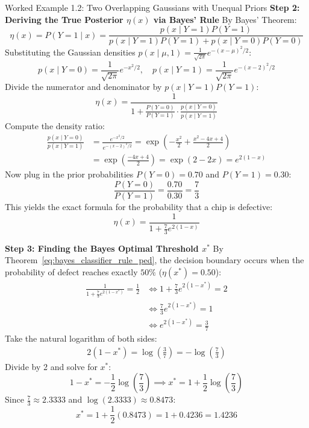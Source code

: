 \begin{examplebox}{Worked Example 1.2: Two Overlapping Gaussians with Unequal Priors}
\textbf{Step 2: Deriving the True Posterior $\eta(x)$ via Bayes' Rule}
By Bayes' Theorem:
\begin{equation*}
\eta(x) = P(Y=1 \mid x) = \frac{p(x \mid Y=1) P(Y=1)}{p(x \mid Y=1) P(Y=1) + p(x \mid Y=0) P(Y=0)}
\end{equation*}
Substituting the Gaussian densities $p(x \mid \mu, 1) = \frac{1}{\sqrt{2\pi}} e^{-(x - \mu)^2 / 2}$:
\begin{equation*}
p(x \mid Y=0) = \frac{1}{\sqrt{2\pi}} e^{-x^2 / 2}, \quad p(x \mid Y=1) = \frac{1}{\sqrt{2\pi}} e^{-(x - 2)^2 / 2}
\end{equation*}
Divide the numerator and denominator by $p(x \mid Y=1) P(Y=1)$:
\begin{equation*}
\eta(x) = \frac{1}{1 + \frac{P(Y=0)}{P(Y=1)} \cdot \frac{p(x \mid Y=0)}{p(x \mid Y=1)}}
\end{equation*}
Compute the density ratio:
\begin{align*}
\frac{p(x \mid Y=0)}{p(x \mid Y=1)} &= \frac{e^{-x^2 / 2}}{e^{-(x - 2)^2 / 2}} = \exp\left( -\frac{x^2}{2} + \frac{x^2 - 4x + 4}{2} \right) \\
&= \exp\left( \frac{-4x + 4}{2} \right) = \exp(2 - 2x) = e^{2(1 - x)}
\end{align*}
Now plug in the prior probabilities $P(Y=0) = 0.70$ and $P(Y=1) = 0.30$:
\begin{equation*}
\frac{P(Y=0)}{P(Y=1)} = \frac{0.70}{0.30} = \frac{7}{3}
\end{equation*}
This yields the exact formula for the probability that a chip is defective:
\begin{equation*}
\eta(x) = \frac{1}{1 + \frac{7}{3} e^{2(1 - x)}}
\end{equation*}

\textbf{Step 3: Finding the Bayes Optimal Threshold $x^*$}
By Theorem~\ref{eq:bayes_classifier_rule_ped}, the decision boundary occurs when the probability of defect reaches exactly $50\%$ ($\eta(x^*) = 0.50$):
\begin{align*}
\frac{1}{1 + \frac{7}{3} e^{2(1 - x^*)}} = \frac{1}{2} &\iff 1 + \frac{7}{3} e^{2(1 - x^*)} = 2 \\
&\iff \frac{7}{3} e^{2(1 - x^*)} = 1 \\
&\iff e^{2(1 - x^*)} = \frac{3}{7}
\end{align*}
Take the natural logarithm of both sides:
\begin{align*}
2(1 - x^*) = \log\left(\frac{3}{7}\right) = -\log\left(\frac{7}{3}\right)
\end{align*}
Divide by 2 and solve for $x^*$:
\begin{equation*}
1 - x^* = -\frac{1}{2} \log\left(\frac{7}{3}\right) \implies x^* = 1 + \frac{1}{2} \log\left(\frac{7}{3}\right)
\end{equation*}
Since $\frac{7}{3} \approx 2.3333$ and $\log(2.3333) \approx 0.8473$:
\begin{equation*}
x^* = 1 + \frac{1}{2}(0.8473) = 1 + 0.4236 = \mathbf{1.4236}
\end{equation*}


\end{examplebox}
